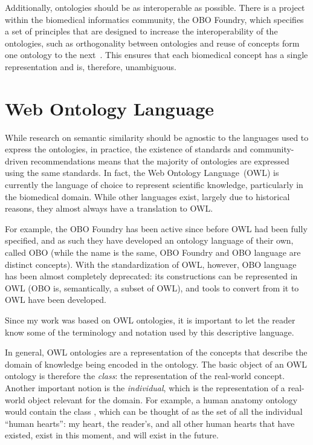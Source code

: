 Additionally, ontologies should be as interoperable as possible. There is a project within the biomedical informatics community, the OBO Foundry, which specifies a set of principles that are designed to increase the interoperability of the ontologies, such as orthogonality between ontologies and reuse of concepts form one ontology to the next~\citep{Smith2007}. This ensures that each biomedical concept has a single representation and is, therefore, unambiguous.


\section{Web Ontology Language} \label{sec:concepts/owl}

While research on semantic similarity should be agnostic to the languages used to express the ontologies, in practice, the existence of standards and community-driven recommendations means that the majority of ontologies are expressed using the same standards. In fact, the Web Ontology Language~(OWL) is currently the language of choice to represent scientific knowledge, particularly in the biomedical domain. While other languages exist, largely due to historical reasons, they almost always have a translation to OWL.

For example, the OBO Foundry has been active since before OWL had been fully specified, and as such they have developed an ontology language of their own, called OBO (while the name is the same, OBO Foundry and OBO language are distinct concepts). With the standardization of OWL, however, OBO language has been almost completely deprecated: its constructions can be represented in OWL (\ie OBO is, semantically, a subset of OWL), and tools to convert from it to OWL have been developed.

Since my work was based on OWL ontologies, it is important to let the reader know some of the terminology and notation used by this descriptive language.

In general, OWL ontologies are a representation of the concepts that describe the domain of knowledge being encoded in the ontology. The basic object of an OWL ontology is therefore the \emph{class}: the representation of the real-world concept. Another important notion is the \emph{individual}, which is the representation of a real-world object relevant for the domain. For example, a human anatomy ontology would contain the class , which can be thought of as the set of all the individual ``human hearts'': my heart, the reader's, and all other human hearts that have existed, exist in this moment, and will exist in the future.

